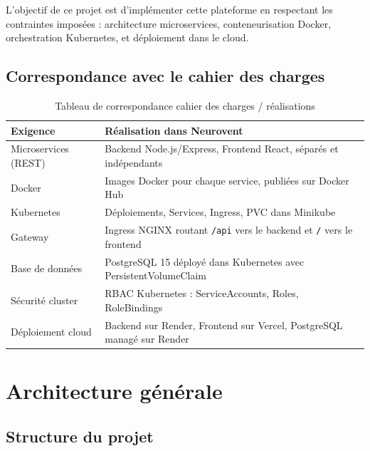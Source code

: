 \documentclass[12pt,a4paper]{article}
\begin{document}
L'objectif de ce projet est d'implémenter cette plateforme en respectant les contraintes
imposées : architecture microservices, conteneurisation Docker, orchestration Kubernetes,
et déploiement dans le cloud.

\subsection{Correspondance avec le cahier des charges}

\begin{table}[H]
  \centering
  \begin{tabularx}{\textwidth}{lX}
    \toprule
    \textbf{Exigence} & \textbf{Réalisation dans Neurovent} \\
    \midrule
    Microservices (REST) & Backend Node.js/Express, Frontend React, séparés et indépendants \\
    Docker & Images Docker pour chaque service, publiées sur Docker Hub \\
    Kubernetes & Déploiements, Services, Ingress, PVC dans Minikube \\
    Gateway & Ingress NGINX routant \texttt{/api} vers le backend et \texttt{/} vers le frontend \\
    Base de données & PostgreSQL 15 déployé dans Kubernetes avec PersistentVolumeClaim \\
    Sécurité cluster & RBAC Kubernetes : ServiceAccounts, Roles, RoleBindings \\
    Déploiement cloud & Backend sur Render, Frontend sur Vercel, PostgreSQL managé sur Render \\
    \bottomrule
  \end{tabularx}
  \caption{Tableau de correspondance cahier des charges / réalisations}
\end{table}

\section{Architecture générale}

\subsection{Structure du projet}
\end{document}
